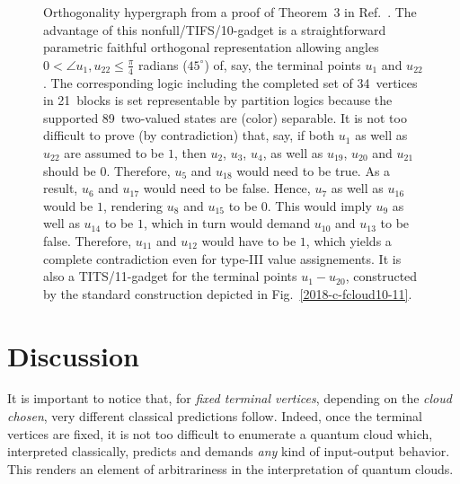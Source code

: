 \documentclass[%
  reprint,
  twocolumn,
 showpacs,
 showkeys,
 preprintnumbers,
 amsmath,amssymb,
 aps,
  prl,
  longbibliography,
 ]{revtex4-1}
\begin{document}
\begin{figure}
\begin{center}
\begin{tikzpicture}  [scale=0.5,rotate=0]
\end{tikzpicture}
\end{center}
\caption{\label{2019-c-HH10}
Orthogonality hypergraph from a proof of
Theorem~3 in Ref.~\cite{Ramanathan-18}.
The advantage of this nonfull/TIFS/10-gadget
is a straightforward parametric faithful orthogonal representation allowing angles
$0< \angle u_1,u_{22} \le \frac{\pi}{4}$ radians ($45^\circ$)
of, say, the terminal points $u_1$ and $u_{22}$.
The corresponding logic including the completed set of
34~vertices in
21~blocks is set representable by partition logics because the supported 89~two-valued
states are (color) separable.
It is not too difficult to prove (by contradiction) that, say,
if both $u_1$ as well as $u_{22}$
are assumed to be $1$, then
$u_2$,
$u_3$,
$u_4$,
as well as
$u_{19}$,
$u_{20}$
and $u_{21}$
should be $0$.
Therefore,
$u_5$ and
$u_{18}$
would need to be true.
As a result,
$u_{6}$ and
$u_{17}$ would need to be false.
Hence,
$u_{7}$ as well as
$u_{16}$ would be $1$,
rendering
$u_{8}$ and
$u_{15}$ to be $0$.
This would imply
$u_{9}$ as well as
$u_{14}$ to be $1$,
which in turn would demand
$u_{10}$ and
$u_{13}$ to be false.
Therefore,
$u_{11}$ and
$u_{12}$ would have to be $1$, which yields a complete contradiction even for type-III
value assignements.
It is also a TITS/11-gadget for the terminal points
$u_1-u_{20}$, constructed by the standard construction depicted in Fig.~\ref{2018-c-fcloud10-11}.
}
\end{figure}

\section{Discussion}

It is important to notice that, for {\em fixed terminal vertices}, depending on the {\em cloud chosen}, very different classical predictions follow.
Indeed, once the terminal vertices are fixed, it is not too difficult to enumerate a quantum cloud which,
interpreted classically, predicts and demands {\em any} kind of input-output behavior.
This renders an element of arbitrariness in the interpretation of quantum clouds.
\end{document}

